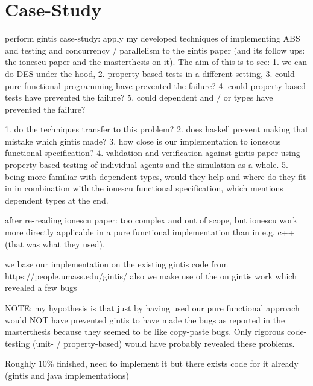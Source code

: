 \section{Case-Study}
perform gintis case-study: apply my developed techniques of implementing ABS and testing and concurrency / parallelism to the gintis paper (and its follow ups: the ionescu paper and the masterthesis on it). 
The aim of this is to see: 
1. we can do DES under the hood, 2. property-based tests in a different setting, 3. could pure functional programming have prevented the failure? 4. could property based tests have prevented the failure? 5. could dependent and / or types have prevented the failure? 

1. do the techniques transfer to this problem? 
2. does haskell prevent making that mistake which gintis made? 
3. how close is our implementation to ionescus functional specification? 
4. validation and verification against gintis paper using property-based testing of individual agents and the simulation as a whole. 
5. being more familiar with dependent types, would they help and where do they fit in in combination with the ionescu functional specification, which mentions dependent types at the end.

after re-reading ionescu paper: too complex and out of scope, but ionescu work more directly applicable in a pure functional implementation than in e.g. c++ (that was what they used).

we base our implementation on the existing gintis code from https://people.umass.edu/gintis/ 
also we make use of the \cite{evensen_extensible_2010} on gintis work which revealed a few bugs

NOTE: my hypothesis is that just by having used our pure functional approach would NOT have prevented gintis to have made the bugs as reported in the masterthesis \cite{evensen_extensible_2010} because they seemed to be like copy-paste bugs. Only rigorous code-testing (unit- / property-based) would have probably revealed these problems.

Roughly 10\% finished, need to implement it but there exists code for it already (gintis and java implementations)